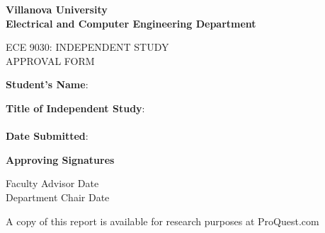 

\begin{center}
\bfseries
Villanova University\\
Electrical and Computer Engineering Department

\vspace{1cm}

\uppercase{ECE 9030: Independent Study\\Approval Form}
\end{center}

\vspace*{0.30cm} 
\noindent \textbf{Student's Name}: \underline{} \\ %
  
\vspace{1cm}

\noindent \textbf{ Title of Independent Study}: \underline{} \\
\vspace{.5in}
\underline{} \\
\vspace{1cm}
\noindent
\noindent \textbf{Date Submitted}: \underline{} \ 


\vspace{1.5cm}
\noindent \textbf{Approving Signatures}\\
\vspace{.5in}


Faculty Advisor\underline{\makebox[.5\textwidth][l]{}} Date\underline{\makebox[.25\textwidth][l]{}}\\
\vspace{.5in}
Department Chair\underline{\makebox[.48\textwidth][l]{}} Date\underline{\makebox[.25\textwidth][l]{}}\\



\vspace{1cm}
\noindent



\vspace{2cm}
\noindent
A copy of this report is available for research purposes at ProQuest.com
\clearpage
